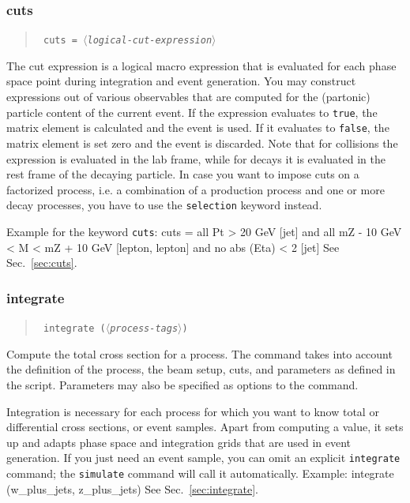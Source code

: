 \documentclass[12pt]{book}
\newenvironment{code}%
  {\begingroup\footnotesize
   \quote
   \verbatim}%
  {\endverbatim
   \endquote
   \endgroup\noindent}
\newenvironment{syntax}%
  {\begin{quote}
   \begin{flushleft}\tt}%
  {\end{flushleft}
   \end{quote}}
\newcommand{\var}[1]{$\langle$\textit{#1}$\rangle$}
\newcommand{\ttt}[1]{\texttt{#1}}
\begin{document}
\subsubsection{cuts}
\begin{syntax}
cuts = \var{logical-cut-expression}
\end{syntax}
The cut expression is a logical macro expression that is evaluated for each
phase space point during integration and event generation.  You may construct
expressions out of various observables that are computed for the (partonic)
particle content of the current event.  If the expression evaluates to
\verb|true|, the matrix element is calculated and the event is used.  If it
evaluates to \verb|false|, the matrix element is set zero and the event is
discarded. Note that for collisions the expression is evaluated in the
lab frame, while for decays it is evaluated in the rest frame of the
decaying particle.  In case you want to impose cuts on a factorized
process, i.e. a combination of a production process and one or more
decay processes, you have to use the \texttt{selection} keyword
instead.  

Example for the keyword \texttt{cuts}:
\begin{code}
cuts = all Pt > 20 GeV [jet]
  and  all mZ - 10 GeV < M < mZ + 10 GeV [lepton, lepton]
  and  no  abs (Eta) < 2 [jet]
\end{code}
See Sec.~\ref{sec:cuts}.


\subsubsection{integrate}
\begin{syntax}
integrate (\var{process-tags})
\end{syntax}
Compute the total cross section for a process.  The command takes into account
the definition of the process, the beam setup, cuts, and parameters as defined
in the script.  Parameters may also be specified as options to the command.

Integration is necessary for each process for which you want to know total or
differential cross sections, or event samples.  Apart from computing a value,
it sets up and adapts phase space and integration grids that are used in event
generation.   If you just need an event sample, you can omit an explicit
\ttt{integrate} command; the \ttt{simulate} command will call it
automatically.  Example:
\begin{code}
integrate (w_plus_jets, z_plus_jets)
\end{code}
See Sec.~\ref{sec:integrate}.
\end{document}
